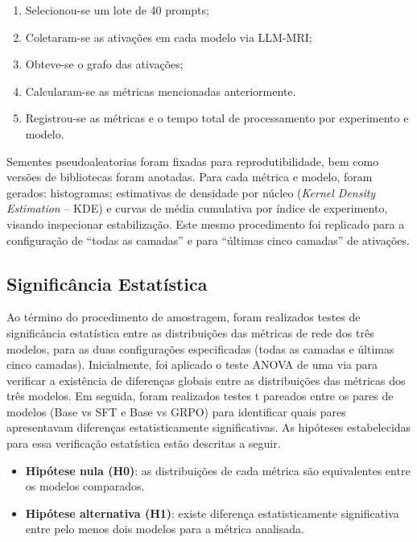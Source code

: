 \begin{enumerate}
    \item Selecionou-se um lote de 40 prompts;
    \item Coletaram-se as ativações em cada modelo via LLM-MRI;
    \item Obteve-se o grafo das ativações;
    \item Calcularam-se as métricas mencionadas anteriormente.
    \item Registrou-se as métricas e o tempo total de processamento por experimento e modelo.
\end{enumerate}

Sementes pseudoaleatorias foram fixadas para reprodutibilidade, bem como versões de bibliotecas foram anotadas. Para cada métrica e modelo, foram gerados: histogramas; estimativas de densidade por núcleo (\textit{Kernel Density Estimation} -- KDE) e curvas de média cumulativa por índice de experimento, visando inspecionar estabilização. Este mesmo procedimento foi replicado para a configuração de ``todas as camadas'' e para ``últimas cinco camadas'' de ativações.

\subsection{Significância Estatística}

Ao término do procedimento de amostragem, foram realizados testes de significância estatística entre as distribuições das métricas de rede dos três modelos, para as duas configurações especificadas (todas as camadas e últimas cinco camadas). Inicialmente, foi aplicado o teste ANOVA de uma via para verificar a existência de diferenças globais entre as distribuições das métricas dos três modelos. Em seguida, foram realizados testes t pareados entre os pares de modelos (Base vs SFT e Base vs GRPO) para identificar quais pares apresentavam diferenças estatisticamente significativas. As hipóteses estabelecidas para essa verificação estatística estão descritas a seguir.

\begin{itemize}
\item \textbf{Hipótese nula (H0)}: as distribuições de cada métrica são equivalentes entre os modelos comparados.
\item \textbf{Hipótese alternativa (H1)}: existe diferença estatisticamente significativa entre pelo menos dois modelos para a métrica analisada.
\end{itemize}

